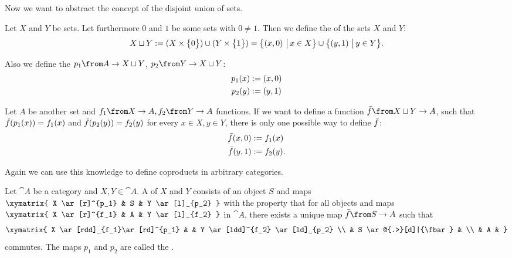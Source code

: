 Now we want to abstract the concept of the disjoint union of sets.

\begin{example}
  \label{ex:coprod:dunion}
  Let $X$ and $Y$ be sets.
  Let furthermore $0$ and $1$ be some sets with $0 \ne 1$.
  Then we define the  of the sets $X$ and $Y$:
  $$X \sqcup Y := (X \times \bigl \{ 0 \bigr \}) \cup (Y \times \bigl \{ 1 \bigr \}) = \bigl \{ \left( x , 0 \right) \,\big|\, x \in X \bigr \} \cup \bigl \{ \left( y , 1 \right) \,\big|\, y \in Y \bigr \}.$$

  Also we define the  $p_1 \from A \to X \dunion Y$, $p_2 \from Y \to X \dunion Y$:
  \begin{alignat*}{2}
    p_1(x) &:= \left( x , 0 \right) \\
    p_2(y) &:= \left( y , 1 \right)
  \end{alignat*}

  Let $A$ be another set and $f_1 \from X \to A, f_2 \from Y \to A$ functions.
  If we want to define a function $\fbar \from X \dunion Y \to A$, such that
  $\bar{f}(p_1(x)) = f_1(x)$ and $\bar{f}(p_2(y)) = f_2(y)$ for every $x \in X, y \in Y$,
  there is only one possible way to define $\bar{f}$:
  \begin{alignat*}{2}
    \bar{f}(x, 0) &:= f_1(x) \\
    \bar{f}(y, 1) &:= f_2(y).
  \end{alignat*}
\end{example}

Again we can use this knowledge to define coproducts in arbitrary categories.

\begin{definition}[Coproduct]
  \label{def:coproduct}
  Let $\cat{A}$ be a category and $X, Y \in \cat{A}$.
  A  of $X$ and $Y$ consists of an object $S$ and maps
  $ \xymatrix{
    X \ar[r]^{p_1} & S & Y \ar[l]_{p_2}
  } $
  with the property that for all objects and maps
  $ \xymatrix{
    X \ar[r]^{f_1} & A & Y \ar[l]_{f_2}
  } $
  in $\cat{A}$, there exists a unique map $\fbar\from S \to A$ such that
  \[ \xymatrix{
    X \ar[rdd]_{f_1}\ar[rd]^{p_1} & & Y \ar[ldd]^{f_2} \ar[ld]_{p_2} \\
    & S \ar@{.>}[d]|{\fbar} & \\
    & A &
  } \]
  commutes. The maps $p_1$ and $p_2$ are called the .
\end{definition}

